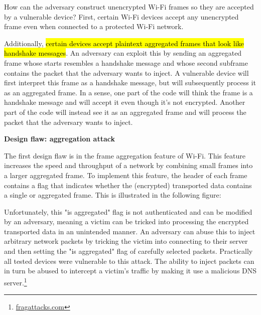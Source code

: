How can the adversary construct unencrypted Wi-Fi frames so they are accepted by a vulnerable device? First, certain Wi-Fi devices accept any unencrypted frame even when connected to a protected Wi-Fi network.

Additionally, \hl{certain devices accept plaintext aggregated frames that look like handshake messages}. An adversary can exploit this by sending an aggregated frame whose starts resembles a handshake message and whose second subframe contains the packet that the adversary wants to inject. A vulnerable device will first interpret this frame as a handshake message, but will subsequently process it as an aggregated frame. In a sense, one part of the code will think the frame is a handshake message and will accept it even though it's not encrypted. Another part of the code will instead see it as an aggregated frame and will process the packet that the adversary wants to inject.

\textbf{Design flaw: aggregation attack}

The first design flaw is in the frame aggregation feature of Wi-Fi. This feature increases the speed and throughput of a network by combining small frames into a larger aggregated frame. To implement this feature, the header of each frame contains a flag that indicates whether the (encrypted) transported data contains a single or aggregated frame. This is illustrated in the following figure:

Unfortunately, this "is aggregated" flag is not authenticated and can be modified by an adversary, meaning a victim can be tricked into processing the encrypted transported data in an unintended manner. An adversary can abuse this to inject arbitrary network packets by tricking the victim into connecting to their server and then setting the "is aggregated" flag of carefully selected packets. Practically all tested devices were vulnerable to this attack. The ability to inject packets can in turn be abused to intercept a victim's traffic by making it use a malicious DNS server.\footnote{\href{https://www.fragattacks.com}{fragattacks.com}}